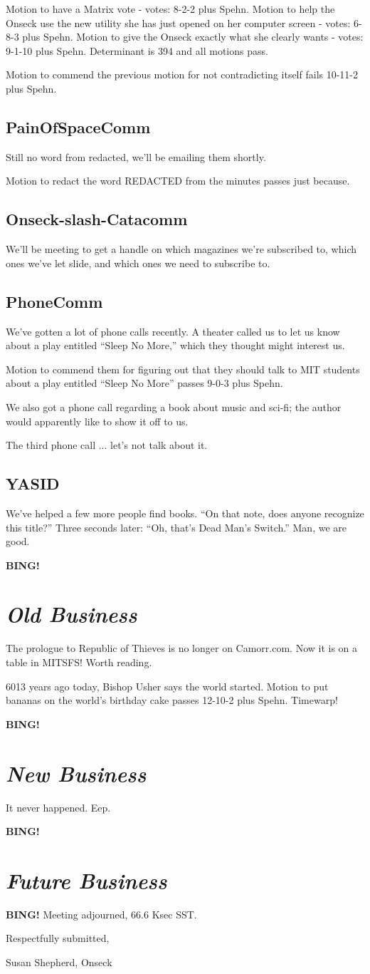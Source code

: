 \documentclass[10pt]{article}
\newcommand{\bing}{{\bf BING!} }
\newcommand{\goto}[1]{\bing \vskip 12pt \section*{{\em{#1}}}}
\newcommand{\ps}{ plus Spehn\xspace}
\begin{document}
Motion to have a Matrix vote - votes: 8-2-2\ps.
Motion to help the Onseck use the new utility she has just opened on her computer screen - votes: 6-8-3\ps.
Motion to give the Onseck exactly what she clearly wants - votes: 9-1-10\ps.
Determinant is 394 and all motions pass.

Motion to commend the previous motion for not contradicting itself fails 10-11-2\ps.

\subsection*{PainOfSpaceComm}
Still no word from redacted, we'll be emailing them shortly.

Motion to redact the word REDACTED from the minutes passes just because.

\subsection*{Onseck-slash-Catacomm}
We'll be meeting to get a handle on which magazines we're subscribed to, which ones we've let slide, and which ones we need to subscribe to.

\subsection*{PhoneComm}
We've gotten a lot of phone calls recently. A theater called us to let us know about a play entitled ``Sleep No More,'' which they thought might interest us.

Motion to commend them for figuring out that they should talk to MIT students about a play entitled ``Sleep No More'' passes  9-0-3\ps.

We also got a phone call regarding a book about music and sci-fi; the author would apparently like to show it off to us.

The third phone call ... let's not talk about it.

\subsection*{YASID}
We've helped a few more people find books. ``On that note, does anyone recognize this title?'' Three seconds later: ``Oh, that's Dead Man's Switch.'' Man, we are good.

\goto{Old Business}
The prologue to Republic of Thieves is no longer on Camorr.com. Now it is on a table in MITSFS! Worth reading.

6013 years ago today, Bishop Usher says the world started.
Motion to put bananas on the world's birthday cake passes 12-10-2\ps.
Timewarp! 

\goto{New Business}

It never happened. Eep.

\goto{Future Business}

\bing
\noindent
Meeting adjourned, 66.6 Ksec SST.

\vspace{18pt}

\centerline{Respectfully submitted,}
\centerline{Susan Shepherd, Onseck}
\end{document}
